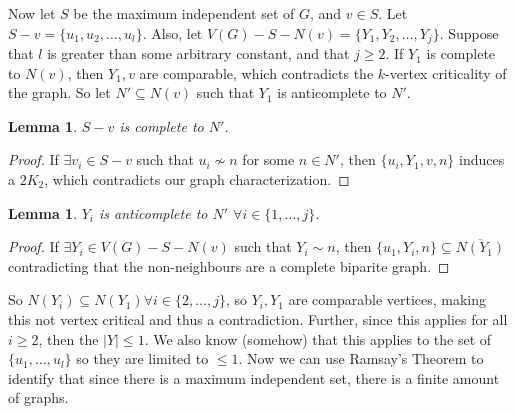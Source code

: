 \documentclass[11pt]{article}
\newtheorem{lemma}[theorem]{Lemma}
\theoremstyle{definition}
\begin{document}
Now let $S$ be the maximum independent set of $G$, and $v \in S$. Let $S - v = \{u_1, u_2, \dots, u_l \}$. Also, let $V(G) - S - N(v) = \{Y_1, Y_2, \dots, Y_j\}$. Suppose that $l$ is greater than some arbitrary constant, and that $j \geq 2$. If $Y_1$ is complete to $N(v)$, then $Y_1, v$ are comparable, which contradicts the $k$-vertex criticality of the graph. So let $N' \subseteq N(v)$ such that $Y_1$ is anticomplete to $N'$.

\begin{lemma}\label{lem:ScompleteNprime}
$S- v$ is complete to $N'$.
\end{lemma}
\begin{proof}
If $\exists v_i \in S - v$ such that $u_i \not \sim n$ for some $n \in N'$, then $\{ u_i, Y_1, v, n \}$ induces a $2K_2$, which contradicts our graph characterization.
\end{proof}

\begin{lemma}\label{lem:anticomplete}
$Y_i$ is anticomplete to $N'$ $\forall i \in \{1, \dots, j\}$.
\end{lemma}
\begin{proof}
If $\exists Y_i \in V(G) - S - N(v)$ such that $Y_i \sim n$, then $\{ u_1, Y_i, n \} \subseteq \overline{N(Y_1)}$ contradicting that the non-neighbours are a complete biparite graph. 
\end{proof}
So $N(Y_i) \subseteq N(Y_1) \forall i \in \{2, \dots, j\}$, so $Y_i, Y_1$ are comparable vertices, making this not vertex critical and thus a contradiction. Further, since this applies for all $i \geq 2$, then the $|Y| \leq 1$. We also know (somehow) that this applies to the set of $\{u_1, \dots, u_l \}$ so they are limited to $\leq 1$.
Now we can use Ramsay's Theorem to identify that since there is a maximum independent set, there is a finite amount of graphs.
\end{document}

